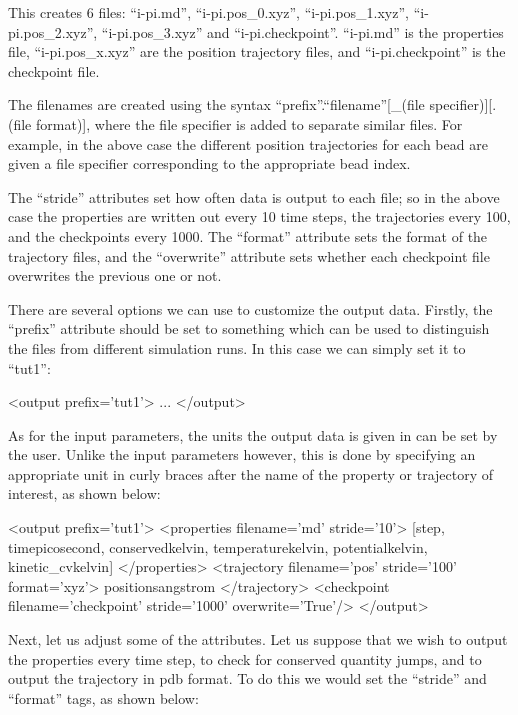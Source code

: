 \documentclass[11pt,english,fleqn]{report}
\newenvironment{code}{%
\footnotesize
\verbatim
}{
\endverbatim
\normalsize
}
\begin{document}
This creates 6 files: {}``i-pi.md'', {}``i-pi.pos\_0.xyz'',
{}``i-pi.pos\_1.xyz'', {}``i-pi.pos\_2.xyz'', {}``i-pi.pos\_3.xyz''
and {}``i-pi.checkpoint''.
{}``i-pi.md'' is the properties file, {}``i-pi.pos\_x.xyz'' are the
position trajectory files, and {}``i-pi.checkpoint'' is the
checkpoint file.

The filenames are created using the syntax
{}``prefix''.{}``filename''[\_(file specifier)][.(file format)], where the file specifier is
added to separate similar files. For example, in the above case the
different position trajectories for each bead are given a file specifier
corresponding to the appropriate bead index.

The {}``stride'' attributes set how often data is output to each file;
so in the above case the properties are written out every 10 time steps,
the trajectories every 100, and the checkpoints every 1000.
The {}``format'' attribute sets the format of the trajectory files,
and the {}``overwrite'' attribute sets whether each checkpoint file
overwrites the previous one or not.

There are several options we can use to customize the
output data. Firstly, the {}``prefix'' attribute should be set to
something which can be used to distinguish the files from different
simulation runs. In this case we can simply set it to {}``tut1'':

\begin{code}
<output prefix='tut1'>
   ...
</output>
\end{code}

As for the input parameters, the units the output data is given in can be
set by the user. Unlike the input parameters however,
this is done by specifying an
appropriate unit in curly braces after the name of the
property or trajectory of interest, as shown below:

\begin{code}
<output prefix='tut1'>
   <properties filename='md' stride='10'>
      [step, time{picosecond}, conserved{kelvin},
       temperature{kelvin}, potential{kelvin}, kinetic_cv{kelvin}]
   </properties>
   <trajectory filename='pos' stride='100' format='xyz'>
      positions{angstrom}
   </trajectory>
   <checkpoint filename='checkpoint' stride='1000' overwrite='True'/>
</output>
\end{code}

Next, let us adjust some of the attributes. Let us suppose that we
wish to output the properties every time step, to check for conserved
quantity jumps, and to output the trajectory in pdb format.
To do this we would set the {}``stride'' and {}``format'' tags,
as shown below:
\end{document}
